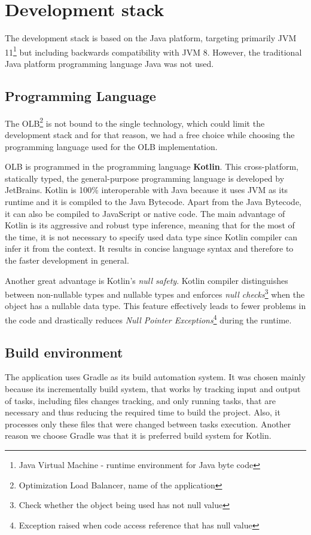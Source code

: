 \section{Development stack}\label{sec:development-stack}
The development stack is based on the Java platform, 
targeting primarily JVM 11\footnote{Java Virtual Machine - runtime environment for Java byte code}
but including backwards compatibility with JVM 8.
However, 
the traditional Java platform programming language Java was not used.

\subsection{Programming Language}\label{subsec:programming-language}
The OLB\footnote{Optimization Load Balancer, name of the application} is not bound to the single technology, 
which could limit the development stack and for that reason,
we had a free choice while choosing the programming language used for the OLB implementation.

OLB is programmed in the programming language \textbf{Kotlin}.
This cross-platform, statically typed, the general-purpose programming language is developed by JetBrains\cite{kotlinReference}.
Kotlin is 100\% interoperable with Java because it uses JVM as its runtime and it is compiled to the Java Bytecode.
Apart from the Java Bytecode, it can also be compiled to JavaScript or native code.\cite{kotlinReference}
The main advantage of Kotlin is its aggressive and robust type inference,
meaning that for the most of the time,
it is not necessary to specify used data type since Kotlin compiler can infer it from the context.\cite{kotlinReference}
It results in concise language syntax and therefore to the faster development in general.

Another great advantage is Kotlin's \textit{null safety}. 
Kotlin compiler distinguishes between non-nullable types and nullable types 
and enforces \textit{null checks}\footnote{Check whether the object being used has not null value} when the object has a nullable data type.
This feature effectively leads to fewer problems in the code
and drastically reduces \textit{Null Pointer Exceptions}\footnote{Exception raised when code access reference that has null value}
during the runtime.

\subsection{Build environment}
The application uses Gradle as its build automation system.
It was chosen mainly because its incrementally build system,
that works by tracking input and output of tasks, 
including files changes tracking, and only running tasks, that are necessary
and thus reducing the required time to build the project. 
Also, it processes only these files that were changed between tasks execution. 
Another reason we choose Gradle was that it is preferred build system for Kotlin.

